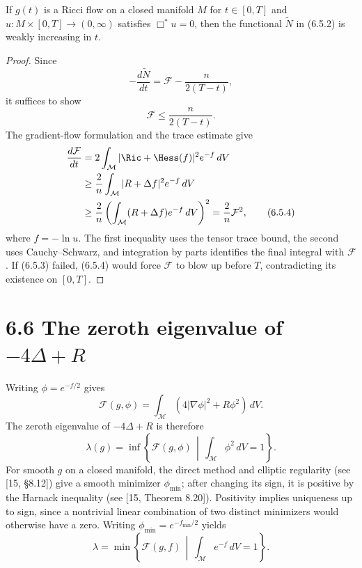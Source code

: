 \begin{lemma}
\label{topping-gradient-flow-classical-entropy-monotone}

If $g(t)$ is a Ricci flow on a closed manifold $M$ for $t\in[0,T]$ and
$u:M\times[0,T]\to(0,\infty)$ satisfies $\Box^*u=0$, then the functional
$\widetilde N$ in (6.5.2) is weakly increasing in $t$.
\end{lemma}

\begin{proof}
\sketch Since
\[
-\frac{d\widetilde N}{dt}=\mathcal F-\frac{n}{2(T-t)},
\]
it suffices to show
\begin{equation}
\mathcal F\leq\frac{n}{2(T-t)}. \tag{6.5.3}
\end{equation}
The gradient-flow formulation and the trace estimate give
\begin{align}
\frac{d\mathcal F}{dt}
&=2\int_{\mathcal M}|\Ric+\Hess(f)|^2e^{-f}\,dV \\
&\geq\frac2n\int_{\mathcal M}|R+\Delta f|^2e^{-f}\,dV \\
&\geq\frac2n\left(\int_{\mathcal M}(R+\Delta f)e^{-f}\,dV\right)^2
=\frac2n\mathcal F^2, \tag{6.5.4}
\end{align}
where $f=-\ln u$. The first inequality uses the tensor trace bound, the
second uses Cauchy--Schwarz, and integration by parts identifies the final
integral with $\mathcal F$. If (6.5.3) failed, (6.5.4) would force $\mathcal F$
to blow up before $T$, contradicting its existence on $[0,T]$.
\end{proof}

\section{6.6 \quad The zeroth eigenvalue of \texorpdfstring{$-4\Delta + R$}{-4 Delta + R}}

Writing $\phi=e^{-f/2}$ gives
\[
\mathcal F(g,\phi)=\int_{\mathcal M}(4|\nabla\phi|^2+R\phi^2)\,dV.
\]
The zeroth eigenvalue of $-4\Delta+R$ is therefore
\[
\lambda(g)=\inf\left\{\mathcal F(g,\phi)\,\middle|\,
\int_{\mathcal M}\phi^2\,dV=1\right\}.
\]
For smooth $g$ on a closed manifold, the direct method and elliptic regularity
(see [15, \S8.12]) give a smooth minimizer $\phi_{\min}$; after changing its
sign, it is positive by the Harnack inequality (see [15, Theorem 8.20]).
Positivity implies uniqueness up to sign, since a nontrivial linear
combination of two distinct minimizers would otherwise have a zero. Writing
$\phi_{\min}=e^{-f_{\min}/2}$ yields
\begin{equation}
\lambda=\min\left\{\mathcal F(g,f)\,\middle|\,
\int_{\mathcal M}e^{-f}\,dV=1\right\}. \tag{6.6.1}
\end{equation}

